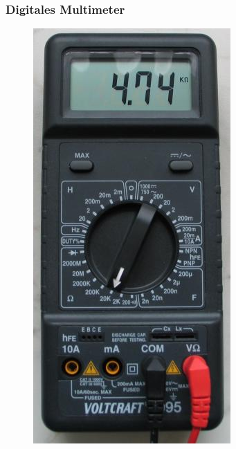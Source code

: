 \begin{frame}
  \frametitle{Digitales Multimeter}
  \begin{center}
    \begin{figure}
      \includegraphics[width=.25\textwidth,height=.75\textheight,keepaspectratio]{e02/digitalmultimeter.jpg}
    \end{figure}
  \end{center}
\end{frame}
